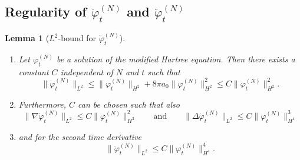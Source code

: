 \documentclass[11pt,a4paper]{scrartcl}
\newtheorem{lem}[thm]{Lemma}
\newcommand{\norm}[1]{\lVert#1\rVert}	%
\newcommand{\ph}{\varphi_t^{(N)}}	%
\newcommand{\phdot}{\dot{\varphi}_t^{(N)}}	%
\newcommand{\phddot}{\ddot{\varphi}_t^{(N)}}	%
\newcommand{\bd}{\begin{displaymath}}			%
\newcommand{\ed}{\end{displaymath}}
\begin{document}
\subsection{Regularity of $\phdot$ and $\phddot$}
\begin{lem}[$L^2$-bound for $\phdot$]
\label{lm:phdotregularity}
\begin{enumerate}
 \item Let $\ph$ be a solution of the modified Hartree equation. Then there exists a constant $C$ independent of $N$ and $t$ such that
 \bd
\norm{\phdot}_{L^2} \leq \norm{\ph}_{H^2} + 8\pi a_0 \norm{\ph}_{H^2}^2 \leq C \norm{\ph}_{H^2}^2.
\ed
\item Furthermore, $C$ can be chosen such that also
\bd
\norm{\nabla \phdot}_{L^2} \leq C \norm{\ph}_{H^3}^2 \qquad \mbox{and} \qquad
\norm{\Delta \phdot}_{L^2} \leq C \norm{\ph}_{H^4}^3
\ed
\item
and for the second time derivative
\bd
\norm{\phddot}_{L^2} \leq C \norm{\ph}_{H^4}^4.
\ed
\end{enumerate}
\end{lem}
\end{document}
